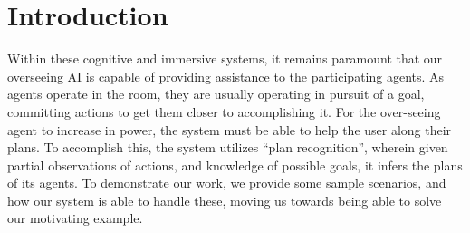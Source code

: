 \section{Introduction}

Within these cognitive and immersive systems, it remains paramount that
our overseeing AI is capable of providing assistance to the participating
agents. As agents operate in the room, they are usually operating in pursuit
of a goal, committing actions to get them closer to accomplishing it. For
the over-seeing agent to increase in power, the system must be able to help
the user along their plans. To accomplish this, the system utilizes ``plan
recognition'', wherein given partial observations of actions, and knowledge
of possible goals, it infers the plans of its agents. To demonstrate our work,
we provide some sample scenarios, and how our system is able to handle these,
moving us towards being able to solve our motivating example.
